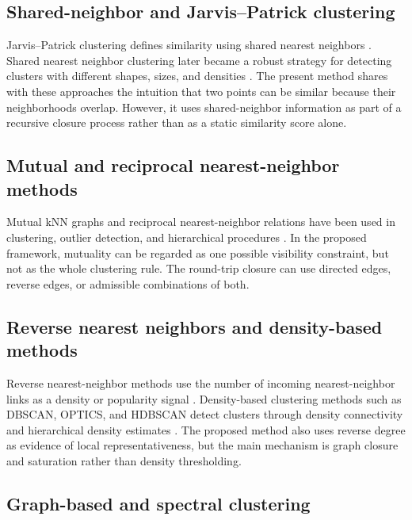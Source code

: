 \documentclass[11pt,a4paper]{article}
\begin{document}
\subsection{Shared-neighbor and Jarvis--Patrick clustering}

Jarvis--Patrick clustering defines similarity using shared nearest neighbors \citep{JarvisPatrick1973}. Shared nearest neighbor clustering later became a robust strategy for detecting clusters with different shapes, sizes, and densities \citep{ErtozSteinbachKumar2003}. The present method shares with these approaches the intuition that two points can be similar because their neighborhoods overlap. However, it uses shared-neighbor information as part of a recursive closure process rather than as a static similarity score alone.

\subsection{Mutual and reciprocal nearest-neighbor methods}

Mutual kNN graphs and reciprocal nearest-neighbor relations have been used in clustering, outlier detection, and hierarchical procedures \citep{BritoChavezQuirozYukich1997,GowdaKrishna1978,SardanaBhatnagar2014,XieLeeWangZhou2023AdaptiveMKNN}. In the proposed framework, mutuality can be regarded as one possible visibility constraint, but not as the whole clustering rule. The round-trip closure can use directed edges, reverse edges, or admissible combinations of both.

\subsection{Reverse nearest neighbors and density-based methods}

Reverse nearest-neighbor methods use the number of incoming nearest-neighbor links as a density or popularity signal \citep{ChowdhuryAmorim2018}. Density-based clustering methods such as DBSCAN, OPTICS, and HDBSCAN detect clusters through density connectivity and hierarchical density estimates \citep{EsterKriegelSanderXu1996,AnkerstBreunigKriegelSander1999,CampelloMoulaviSander2013,CampelloMoulaviZimekSander2015}. The proposed method also uses reverse degree as evidence of local representativeness, but the main mechanism is graph closure and saturation rather than density thresholding.

\subsection{Graph-based and spectral clustering}
\end{document}
